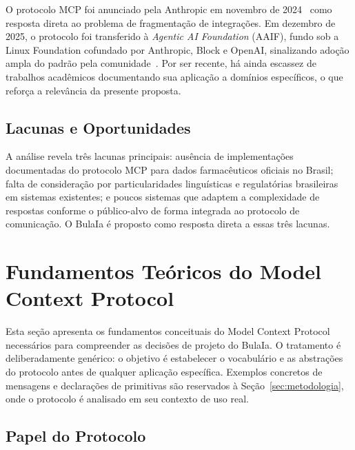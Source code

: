 \documentclass[12pt]{article}
\begin{document}
O protocolo MCP foi anunciado pela Anthropic em novembro de 2024~\cite{anthropic2024mcp} como resposta direta ao problema de fragmentação de integrações. Em dezembro de 2025, o protocolo foi transferido à \emph{Agentic AI Foundation} (AAIF), fundo sob a Linux Foundation cofundado por Anthropic, Block e OpenAI, sinalizando adoção ampla do padrão pela comunidade~\cite{wikipedia2025mcp}. Por ser recente, há ainda escassez de trabalhos acadêmicos documentando sua aplicação a domínios específicos, o que reforça a relevância da presente proposta.

\subsection{Lacunas e Oportunidades}

A análise revela três lacunas principais: ausência de implementações documentadas do protocolo MCP para dados farmacêuticos oficiais no Brasil; falta de consideração por particularidades linguísticas e regulatórias brasileiras em sistemas existentes; e poucos sistemas que adaptem a complexidade de respostas conforme o público-alvo de forma integrada ao protocolo de comunicação. O BulaIa é proposto como resposta direta a essas três lacunas.


\section{Fundamentos Teóricos do Model Context Protocol}
\label{sec:fundamentos}

Esta seção apresenta os fundamentos conceituais do Model Context Protocol
necessários para compreender as decisões de projeto do BulaIa. O
tratamento é deliberadamente genérico: o objetivo é estabelecer o
vocabulário e as abstrações do protocolo antes de qualquer aplicação
específica. Exemplos concretos de mensagens e declarações de primitivas
são reservados à Seção~\ref{sec:metodologia}, onde o protocolo é
analisado em seu contexto de uso real.

\subsection{Papel do Protocolo}
\label{subsec:visao-geral}
\end{document}
